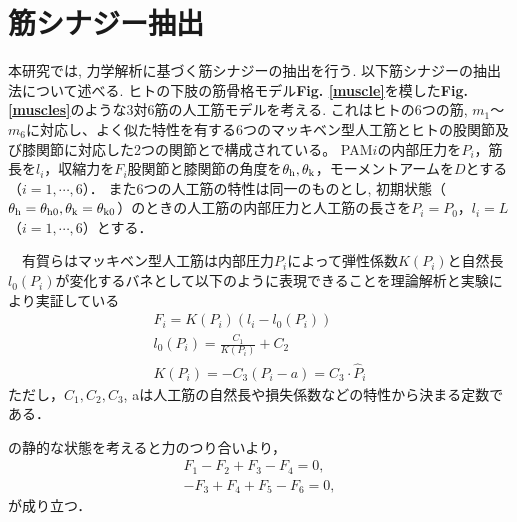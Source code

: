\section{筋シナジー抽出}
本研究では, 力学解析に基づく筋シナジーの抽出を行う.  以下筋シナジーの抽出法について述べる.  ヒトの下肢の筋骨格モデル{\bf Fig. \ref{muscle}}を模した{\bf Fig. \ref{muscles}}のような3対6筋の人工筋モデルを考える.  
これはヒトの6つの筋, $m_1$～$m_6$に対応し、よく似た特性を有する6つのマッキベン型人工筋とヒトの股関節及び膝関節に対応した2つの関節とで構成されている。
PAM$i$の内部圧力を$P_i$，筋長を$l_i$，収縮力を$F_i$股関節と膝関節の角度を$\theta_{\rm h},\theta_{\rm k}$，モーメントアームを$D$とする（$i=1,\cdots,6$）．
また6つの人工筋の特性は同一のものとし, 初期状態（$\theta_{\rm h}=\theta_{{\rm h}0},\theta_{\rm k}=\theta_{{\rm k}0}$）のときの人工筋の内部圧力と人工筋の長さを$P_i=P_0$，$l_i=L$（$i=1,\cdots,6$）とする．

　有賀らはマッキベン型人工筋は内部圧力$P_i$によって弾性係数$K(P_i)$と自然長$l_0(P_i)$が変化するバネとして以下のように表現できることを理論解析と実験により実証している%
\begin{eqnarray}
 \label{model1}
 F_i=K(P_i)(l_i-l_0(P_i))\\
 \label{model2}
 l_0(P_i)=\frac{C_1}{K(P_i)}+C_2\\
 \label{model3}
 K(P_i)=-C_3(P_i-a)=C_3\cdot\hat{P}_i
\end{eqnarray}
ただし，$C_1,C_2,C_3$, aは人工筋の自然長や損失係数などの特性から決まる定数である．

の静的な状態を考えると力のつり合いより，
\begin{eqnarray}
 \label{balance1}
 F_1-F_2+F_3-F_4=0,\\
 \label{balance2}
 -F_3+F_4+F_5-F_6=0,
\end{eqnarray}
が成り立つ．


